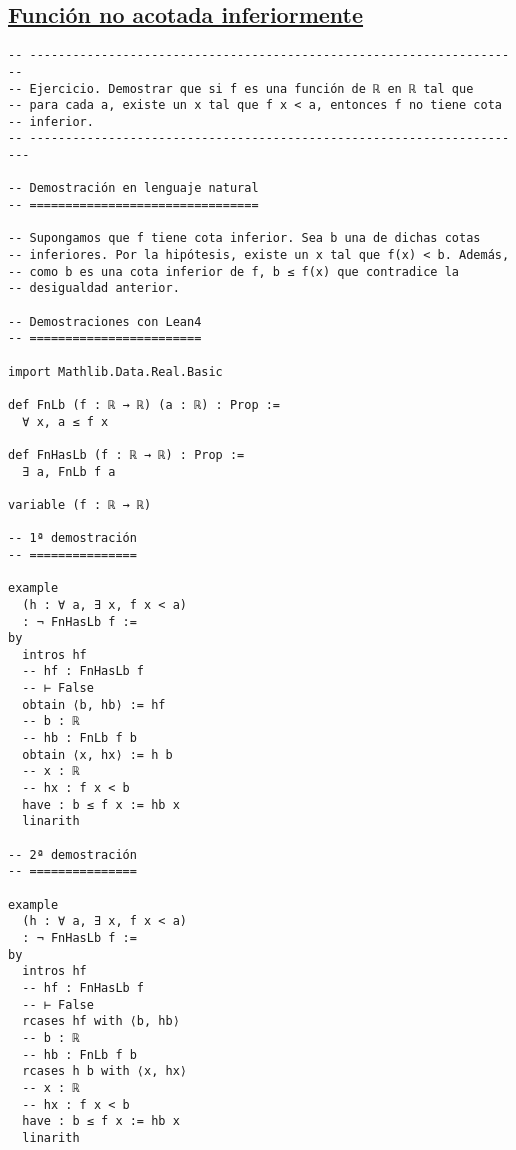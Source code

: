 \subsection{\href{./src/Logica/Funcion\_no\_acotada\_inferiormente.lean}{Función no acotada inferiormente}}
\label{sec:org5704d39}
\begin{verbatim}
-- ---------------------------------------------------------------------
-- Ejercicio. Demostrar que si f es una función de ℝ en ℝ tal que
-- para cada a, existe un x tal que f x < a, entonces f no tiene cota
-- inferior.
-- ----------------------------------------------------------------------

-- Demostración en lenguaje natural
-- ================================

-- Supongamos que f tiene cota inferior. Sea b una de dichas cotas
-- inferiores. Por la hipótesis, existe un x tal que f(x) < b. Además,
-- como b es una cota inferior de f, b ≤ f(x) que contradice la
-- desigualdad anterior.

-- Demostraciones con Lean4
-- ========================

import Mathlib.Data.Real.Basic

def FnLb (f : ℝ → ℝ) (a : ℝ) : Prop :=
  ∀ x, a ≤ f x

def FnHasLb (f : ℝ → ℝ) : Prop :=
  ∃ a, FnLb f a

variable (f : ℝ → ℝ)

-- 1ª demostración
-- ===============

example
  (h : ∀ a, ∃ x, f x < a)
  : ¬ FnHasLb f :=
by
  intros hf
  -- hf : FnHasLb f
  -- ⊢ False
  obtain ⟨b, hb⟩ := hf
  -- b : ℝ
  -- hb : FnLb f b
  obtain ⟨x, hx⟩ := h b
  -- x : ℝ
  -- hx : f x < b
  have : b ≤ f x := hb x
  linarith

-- 2ª demostración
-- ===============

example
  (h : ∀ a, ∃ x, f x < a)
  : ¬ FnHasLb f :=
by
  intros hf
  -- hf : FnHasLb f
  -- ⊢ False
  rcases hf with ⟨b, hb⟩
  -- b : ℝ
  -- hb : FnLb f b
  rcases h b with ⟨x, hx⟩
  -- x : ℝ
  -- hx : f x < b
  have : b ≤ f x := hb x
  linarith
\end{verbatim}

